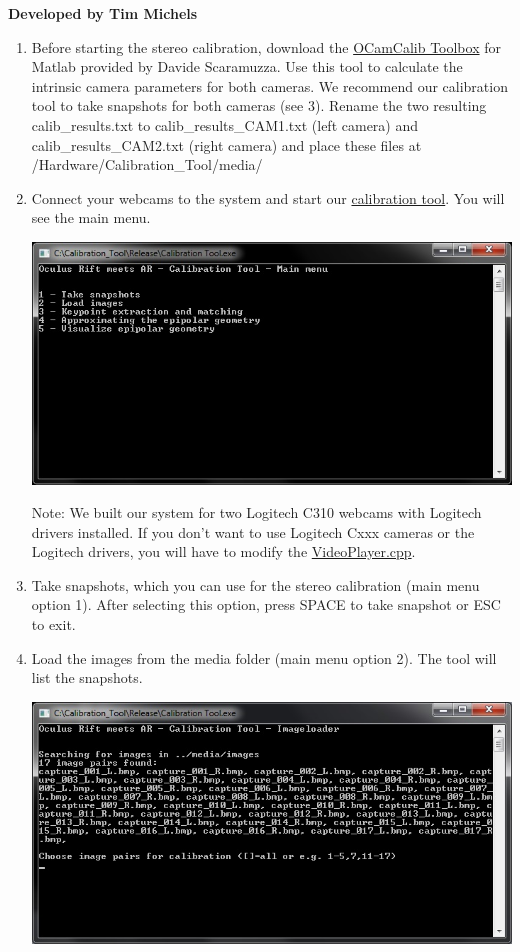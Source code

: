 \begin{center}
\textbf{Developed by Tim Michels}
\end{center}
\begin{enumerate}
\item 
Before starting the stereo calibration, download the \href{https://sites.google.com/site/scarabotix/ocamcalib-toolbox}{OCamCalib Toolbox} for Matlab provided by Davide Scaramuzza\cite{ocamcalib}. Use this tool to calculate the intrinsic camera parameters for both cameras. We recommend our calibration tool to take snapshots for both cameras (see 3). Rename the two resulting calib\_results.txt to calib\_results\_CAM1.txt (left camera) and calib\_results\_CAM2.txt (right camera) and place these files at /Hardware/Calibration\_Tool/media/
\item
  Connect your webcams to the system and start our
  \href{https://github.com/ands/OculusMeetsAR/tree/master/Hardware/Calibration_Tool}{calibration
  tool}. You will see the main menu.
	
  \includegraphics*[width=.92\textwidth]{0.jpg}
	
  Note: We built our system for two Logitech C310 webcams with Logitech
  drivers installed. If you don't want to use Logitech Cxxx cameras or
  the Logitech drivers, you will have to modify the
  \href{https://github.com/ands/OculusMeetsAR/tree/master/ARLib/src/Video}{VideoPlayer.cpp}.
\item
  Take snapshots, which you can use for the stereo calibration (main
  menu option 1). After selecting this option, press SPACE to take
  snapshot or ESC to exit.
\item
  Load the images from the media folder (main menu option 2). The tool
  will list the snapshots.
	
  \includegraphics*[width=.92\textwidth]{2.jpg}
	

\end{enumerate}
